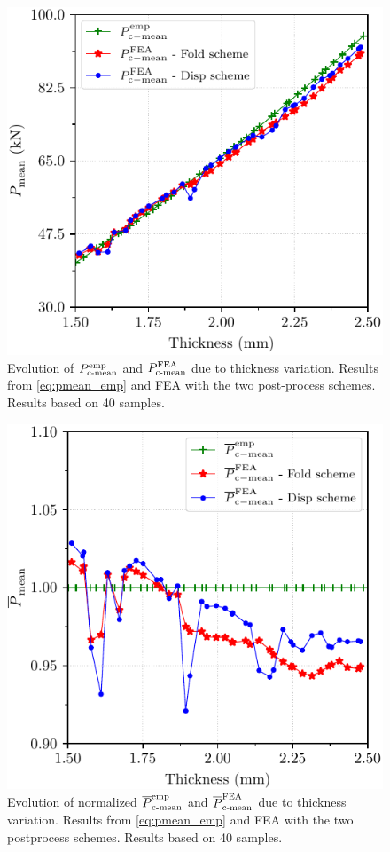 \documentclass[12pt,number,preprint,review,times]{elsarticle}
\begin{document}
\begin{figure}[htpb]
  \centering
   \includegraphics[width=.9\columnwidth]{./Pmean_evolution.pdf}
  \caption{Evolution of $P^{\mathrm{emp}}_{\mathrm{c{\text -}mean}}$ and $P^{\mathrm{FEA}}_{\mathrm{c{\text -}mean}}$ due to thickness variation. Results from \cref{eq:pmean_emp} and FEA with the two post-process schemes. Results based on 40 samples.}
  \label{fig:Pmean_evolution2}
\end{figure}

\begin{figure}[htpb]
  \centering
   \includegraphics[width=.9\columnwidth]{./Pmean_evolution_normalized.pdf}
   \caption{Evolution of normalized $\overline{P}^{\mathrm{emp}}_{\mathrm{c{\text -}mean}}$ and $\overline{P}^{\mathrm{FEA}}_{\mathrm{c{\text -}mean}}$ due to thickness variation. Results from \cref{eq:pmean_emp} and FEA with the two postprocess schemes. Results based on 40 samples.}
  \label{fig:Pmean_evolution_normalized}
\end{figure}
\end{document}
